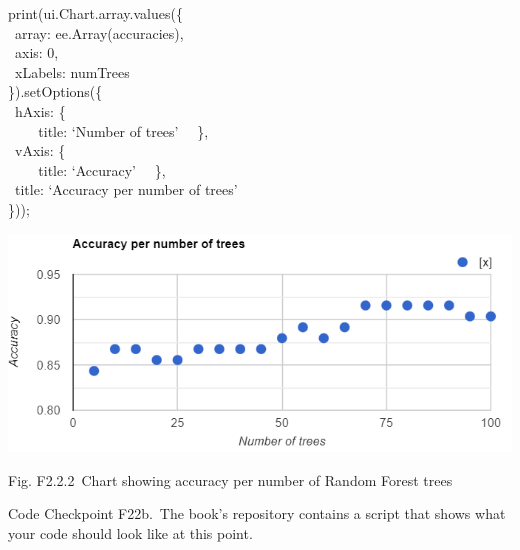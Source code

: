 \documentclass[
  letterpaper,
  DIV=11,
  numbers=noendperiod]{scrreprt}
\begin{document}
print(ui.Chart.array.values(\{\\
\hspace*{0.333em} ~array: ee.Array(accuracies),\\
\hspace*{0.333em} ~axis: 0,\\
\hspace*{0.333em} ~xLabels: numTrees\\
\}).setOptions(\{\\
\hspace*{0.333em} ~hAxis: \{\\
\hspace*{0.333em} ~ ~ ~title: `Number of trees'~ ~\},\\
\hspace*{0.333em} ~vAxis: \{\\
\hspace*{0.333em} ~ ~ ~title: `Accuracy'~ ~\},\\
\hspace*{0.333em} ~title: `Accuracy per number of trees'\\
\}));

\includegraphics{./F2/image45.png}

Fig. F2.2.2~Chart showing accuracy per number of Random Forest trees

\begin{tcolorbox}[enhanced jigsaw, left=2mm, breakable, rightrule=.15mm, opacityback=0, colframe=quarto-callout-note-color-frame, colbacktitle=quarto-callout-note-color!10!white, arc=.35mm, opacitybacktitle=0.6, toptitle=1mm, colback=white, leftrule=.75mm, title=\textcolor{quarto-callout-note-color}{\faInfo}\hspace{0.5em}{Note}, toprule=.15mm, bottomtitle=1mm, titlerule=0mm, bottomrule=.15mm, coltitle=black]

Code Checkpoint F22b.~The book's repository contains a script that shows
what your code should look like at this point.

\end{tcolorbox}
\end{document}
